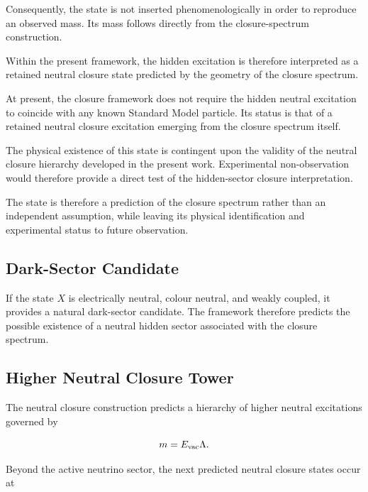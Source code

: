 \documentclass[11pt]{article}
\theoremstyle{definition}
\theoremstyle{remark}
\begin{document}
Consequently, the state is not inserted phenomenologically in
order to reproduce an observed mass. Its mass follows directly
from the closure-spectrum construction.

Within the present framework, the hidden excitation is therefore
interpreted as a retained neutral closure state predicted by the
geometry of the closure spectrum.

At present, the closure framework does not require the hidden
neutral excitation to coincide with any known Standard Model
particle. Its status is that of a retained neutral closure
excitation emerging from the closure spectrum itself.

The physical existence of this state is contingent upon the
validity of the neutral closure hierarchy developed in the
present work. Experimental non-observation would therefore
provide a direct test of the hidden-sector closure
interpretation.

The state is therefore a prediction of the closure spectrum
rather than an independent assumption, while leaving its
physical identification and experimental status to future
observation.



\subsection{Dark-Sector Candidate}
\label{subsec:prediction_dark_sector}

If the state $X$ is electrically neutral, colour neutral, and
weakly coupled, it provides a natural dark-sector candidate.
The framework therefore predicts the possible existence of a
neutral hidden sector associated with the closure spectrum.


\subsection{Higher Neutral Closure Tower}
\label{subsec:prediction_neutral_tower}

The neutral closure construction predicts a hierarchy of higher
neutral excitations governed by

\begin{equation}
m
=
E_{\rm vac}\Lambda.
\end{equation}

Beyond the active neutrino sector, the next predicted neutral
closure states occur at
\end{document}
